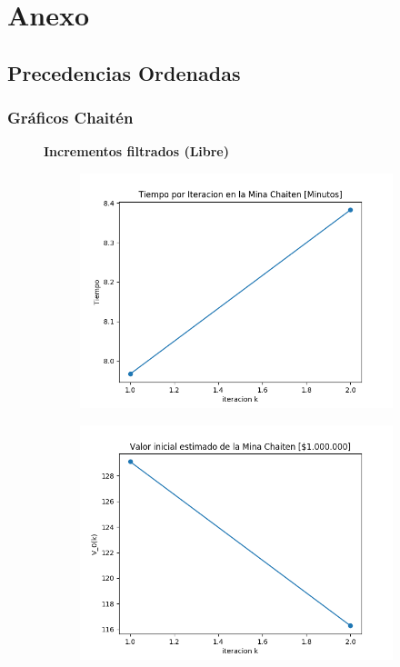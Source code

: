 \documentclass[12pt,letterpaper]{article}
\begin{document}
\section{Anexo}

\subsection{Precedencias Ordenadas}
\subsubsection{Gráficos Chaitén}

\begin{figure}[H]
  \captionsetup[subfigure]{labelformat=empty}
  \centering
  
   \textbf{Incrementos filtrados (Libre)}
  
  \begin{subfigure}[b]{0.4\textwidth}
     \includegraphics[width=\textwidth]{Graficos/Incrementos_filtrados/libre/chaiten_inc_times.png}
     \caption{}
     \label{asda}
  \end{subfigure}
  \begin{subfigure}[b]{0.4\textwidth}
     \includegraphics[width=\textwidth]{Graficos/Incrementos_filtrados/libre/chaiten_inc_v_k.png}
     \caption{}
     \label{fig:ex2}
  \end{subfigure}
  

\end{figure}
\end{document}
